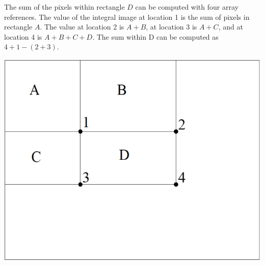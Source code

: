 \begin{minipage}{0.7\textwidth}
    The sum of the pixels within rectangle $D$ can be computed with four array references.
    The value of the integral image at location 1 is the sum of pixels in rectangle $A$.
    The value at location 2 is $A + B$, at location 3 is $A + C$, and at location 4 is $A + B + C + D$.
    The sum within D can be computed as $4 + 1 - (2 + 3)$.
\end{minipage}
\begin{minipage}{0.3\textwidth}
    \includegraphics[width=1.0\textwidth]{sections/FindingMultipleObjects/img/integral_image.png}
\end{minipage}

